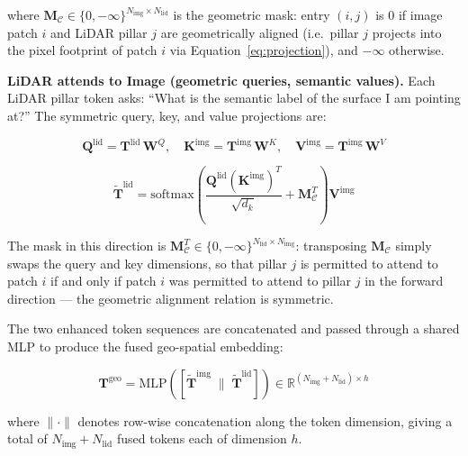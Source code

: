 \documentclass{book}
\begin{document}
where $\mathbf{M}_{\mathcal{C}} \in \{0, -\infty\}^{N_{\text{img}}
\times N_{\text{lid}}}$ is the geometric mask: entry $(i,j)$ is $0$
if image patch $i$ and LiDAR pillar $j$ are geometrically aligned
(i.e.\ pillar $j$ projects into the pixel footprint of patch $i$
via Equation~\ref{eq:projection}), and $-\infty$ otherwise.

\textbf{LiDAR attends to Image (geometric queries, semantic values).}
Each LiDAR pillar token asks: ``What is the semantic label of the
surface I am pointing at?''  The symmetric query, key, and value
projections are:

\begin{equation}
  \mathbf{Q}^{\text{lid}} = \mathbf{T}^{\text{lid}}\,\mathbf{W}^Q,\quad
  \mathbf{K}^{\text{img}} = \mathbf{T}^{\text{img}}\,\mathbf{W}^K,\quad
  \mathbf{V}^{\text{img}} = \mathbf{T}^{\text{img}}\,\mathbf{W}^V
  \label{eq:lid2img_qkv}
\end{equation}

\begin{equation}
  \widetilde{\mathbf{T}}^{\text{lid}} =
    \mathrm{softmax}\!\!\left(
      \frac{\mathbf{Q}^{\text{lid}}(\mathbf{K}^{\text{img}})^T}{\sqrt{d_k}}
      + \mathbf{M}_{\mathcal{C}}^T
    \right)\mathbf{V}^{\text{img}}
  \label{eq:lid2img_attn}
\end{equation}

The mask in this direction is $\mathbf{M}_{\mathcal{C}}^T \in
\{0,-\infty\}^{N_{\text{lid}} \times N_{\text{img}}}$: transposing
$\mathbf{M}_{\mathcal{C}}$ simply swaps the query and key dimensions,
so that pillar $j$ is permitted to attend to patch $i$ if and only
if patch $i$ was permitted to attend to pillar $j$ in the forward
direction --- the geometric alignment relation is symmetric.

The two enhanced token sequences are concatenated and passed through
a shared MLP to produce the fused geo-spatial embedding:

\begin{equation}
  \mathbf{T}^{\text{geo}} =
    \mathrm{MLP}\!\left(
      \left[\widetilde{\mathbf{T}}^{\text{img}}
      \;\big\|\;
      \widetilde{\mathbf{T}}^{\text{lid}}\right]
    \right)
    \in \mathbb{R}^{(N_{\text{img}} + N_{\text{lid}}) \times h}
  \label{eq:geo_embedding}
\end{equation}

where $\|\cdot\|$ denotes row-wise concatenation along the token
dimension, giving a total of $N_{\text{img}} + N_{\text{lid}}$ fused
tokens each of dimension $h$.
\end{document}
